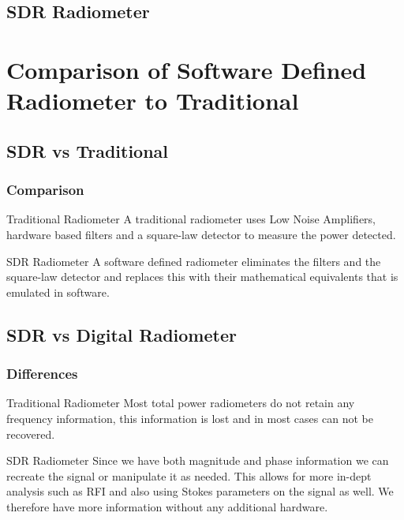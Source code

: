 \documentclass[notes]{beamer}
\begin{document}
\subsection{SDR Radiometer}
\section{Comparison of Software Defined Radiometer to Traditional}
\subsection{SDR vs Traditional}
\begin{frame}
\frametitle{Comparison}
\begin{block}{Traditional Radiometer}
A traditional radiometer uses Low Noise Amplifiers, hardware based filters and a square-law detector to measure the power detected.  
\end{block}

\begin{block}{SDR Radiometer}
A software defined radiometer eliminates the filters and the square-law detector and replaces this with their mathematical equivalents that is emulated in software.   
\end{block}
\end{frame}
\subsection{SDR vs Digital Radiometer}
\begin{frame}
\frametitle{Differences}
\begin{block}{Traditional Radiometer}
Most total power radiometers do not retain any frequency information, this information is lost and in most cases can not be recovered.
\end{block}

\begin{block}{SDR Radiometer}
Since we have both magnitude and phase information we can recreate the signal or manipulate it as needed.  This allows for more in-dept analysis such as RFI and also using Stokes parameters on the signal as well.  We therefore have more information without any additional hardware\cite{Ruf}.
\end{block}
\end{frame}
\end{document}
